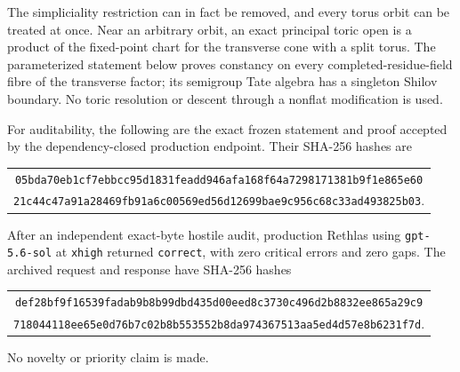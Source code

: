 The simpliciality restriction can in fact be removed, and every torus orbit
can be treated at once.  Near an arbitrary orbit, an exact principal toric
open is a product of the fixed-point chart for the transverse cone with a
split torus.  The parameterized statement below proves constancy on every
completed-residue-field fibre of the transverse factor; its semigroup Tate
algebra has a singleton Shilov boundary.  No toric resolution or descent
through a nonflat modification is used.

For auditability, the following are the exact frozen statement and proof
accepted by the dependency-closed production endpoint.  Their SHA-256 hashes
are
\begin{center}
\small
\begin{tabular}{@{}c@{}}
\nolinkurl{05bda70eb1cf7ebbcc95d1831feadd946afa168f64a7298171381b9f1e865e60}\\
\nolinkurl{21c44c47a91a28469fb91a6c00569ed56d12699bae9c956c68c33ad493825b03}.
\end{tabular}
\end{center}
After an independent exact-byte hostile audit, production Rethlas using
\texttt{gpt-5.6-sol} at \texttt{xhigh} returned \texttt{correct}, with zero
critical errors and zero gaps.  The archived request and response have
SHA-256 hashes
\begin{center}
\small
\begin{tabular}{@{}c@{}}
\nolinkurl{def28bf9f16539fadab9b8b99dbd435d00eed8c3730c496d2b8832ee865a29c9}\\
\nolinkurl{718044118ee65e0d76b7c02b8b553552b8da974367513aa5ed4d57e8b6231f7d}.
\end{tabular}
\end{center}
No novelty or priority claim is made.




\begingroup
\makeatletter
\let\pzeroonesixalltoric@original@nonumberplain\th@nonumberplain
\def\th@nonumberplain{%
  \pzeroonesixalltoric@original@nonumberplain
  \def\@opargbegintheorem##1##2##3{%
    \item[\theorem@headerfont\hskip\labelsep ##3\theorem@separator]}}
\makeatother



\endgroup

